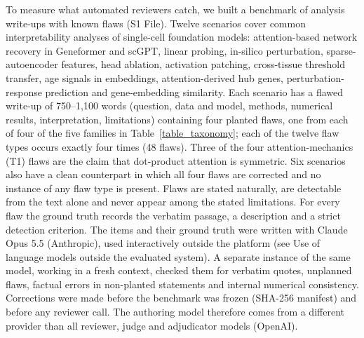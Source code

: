 \documentclass[10pt,letterpaper]{article}
\begin{document}
To measure what automated reviewers catch, we built a benchmark of analysis write-ups with known flaws (S1 File). Twelve scenarios cover common interpretability analyses of single-cell foundation models: attention-based network recovery in Geneformer and scGPT, linear probing, in-silico perturbation, sparse-autoencoder features, head ablation, activation patching, cross-tissue threshold transfer, age signals in embeddings, attention-derived hub genes, perturbation-response prediction and gene-embedding similarity. Each scenario has a flawed write-up of 750--1,100 words (question, data and model, methods, numerical results, interpretation, limitations) containing four planted flaws, one from each of four of the five families in Table~\ref{table_taxonomy}; each of the twelve flaw types occurs exactly four times (48 flaws). Three of the four attention-mechanics (T1) flaws are the claim that dot-product attention is symmetric. Six scenarios also have a clean counterpart in which all four flaws are corrected and no instance of any flaw type is present. Flaws are stated naturally, are detectable from the text alone and never appear among the stated limitations. For every flaw the ground truth records the verbatim passage, a description and a strict detection criterion. The items and their ground truth were written with Claude Opus 5.5 (Anthropic), used interactively outside the platform (see Use of language models outside the evaluated system). A separate instance of the same model, working in a fresh context, checked them for verbatim quotes, unplanned flaws, factual errors in non-planted statements and internal numerical consistency. Corrections were made before the benchmark was frozen (SHA-256 manifest) and before any reviewer call. The authoring model therefore comes from a different provider than all reviewer, judge and adjudicator models (OpenAI).
\end{document}
